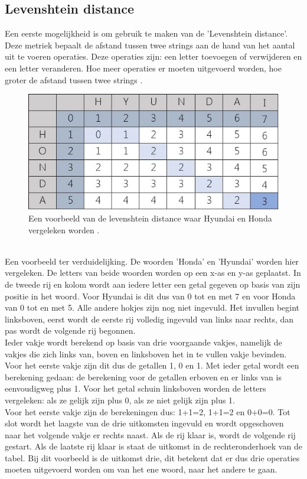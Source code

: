 \subsection{Levenshtein distance}
Een eerste mogelijkheid is om gebruik te maken van de 'Levenshtein distance'. Deze metriek bepaalt de afstand tussen twee strings aan de hand van het aantal uit te voeren operaties. Deze operaties zijn: een letter toevoegen of verwijderen en een letter veranderen. Hoe meer operaties er moeten uitgevoerd worden, hoe groter de afstand tussen twee strings \autocite{Wikiversity2022}.
\\\indent
\begin{figure}[h]
    \centering
    \includegraphics[width=0.7\linewidth]{../foto's/levenshtein-example}
    \caption{Een voorbeeld van de levenshtein distance waar Hyundai en Honda vergeleken worden \autocite{Cuelogic2017}.}
    \label{fig:levenshtein_voorbeeld_Hyundai_Honda}
\end{figure}
\\\indent
Een voorbeeld ter verduidelijking. De woorden 'Honda' en 'Hyundai' worden hier vergeleken. De letters van beide woorden worden op een x-as en y-as geplaatst. In de tweede rij en kolom wordt aan iedere letter een getal gegeven op basis van zijn positie in het woord. Voor Hyundai is dit dus van 0 tot en met 7 en voor Honda van 0 tot en met 5. Alle andere hokjes zijn nog niet ingevuld. Het invullen begint linksboven, eerst wordt de eerste rij volledig ingevuld van links naar rechts, dan pas wordt de volgende rij begonnen.
\\\indent
Ieder vakje wordt berekend op basis van drie voorgaande vakjes, namelijk de vakjes die zich links van, boven en linksboven het in te vullen vakje bevinden. Voor het eerste vakje zijn dit dus de getallen 1, 0 en 1. Met ieder getal wordt een berekening gedaan: de berekening voor de getallen erboven en er links van is eenvoudigweg plus 1. Voor het getal schuin linksboven worden de letters vergeleken: als ze gelijk zijn plus 0, als ze niet gelijk zijn plus 1.
\\\indent
Voor het eerste vakje zijn de berekeningen dus: 1+1=2, 1+1=2 en 0+0=0. Tot slot wordt het laagste van de drie uitkomsten ingevuld en wordt opgeschoven naar het volgende vakje er rechts naast. Als de rij klaar is, wordt de volgende rij gestart. Als de laatste rij klaar is staat de uitkomst in de rechteronderhoek van de tabel. Bij dit voorbeeld is de uitkomst drie, dit betekent dat er dus drie operaties moeten uitgevoerd worden om van het ene woord, naar het andere te gaan.
